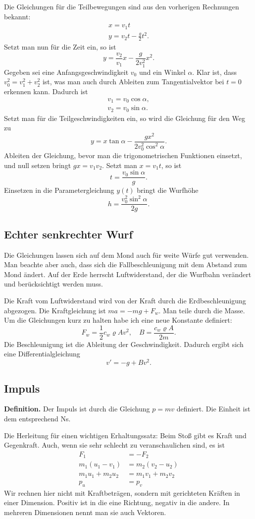 \documentclass[a4paper,10pt,fleqn,twocolumn,twoside]{scrartcl}
\begin{document}
Die Gleichungen für die Teilbewegungen sind aus den vorherigen
Rechnungen bekannt:%
\begin{gather*}
x = v_1t\\
y = v_2t - \frac{g}{2}t^2.
\end{gather*}
Setzt man nun für die Zeit ein, so ist%
\[y = \frac{v_2}{v_1}x - \frac{g}{2v_1^2} x^2.\]
Gegeben sei eine Anfangsgeschwindigkeit $v_0$ und ein
Winkel $\alpha$. Klar ist, dass $v_0^2=v_1^2+v_2^2$ ist,
was man auch durch Ableiten zum Tangentialvektor bei $t=0$
erkennen kann. Dadurch ist%
\begin{gather*}
v_1 = v_0\cos\alpha,\\
v_2 = v_0\sin\alpha.
\end{gather*}
Setzt man für die Teilgeschwindigkeiten ein, so wird die Gleichung
für den Weg zu%
\[y = x\tan\alpha - \frac{gx^2}{2v_0^2\cos^2\alpha}.\]
Ableiten der Gleichung, bevor man die trigonometrischen Funktionen
einsetzt, und null setzen bringt $gx = v_1v_2$.
Setzt man $x=v_1t$, so ist%
\[t = \frac{v_0\sin\alpha}{g}.\]
Einsetzen in die Parametergleichung $y(t)$ bringt die Wurfhöhe%
\[h = \frac{v_0^2\sin^2\alpha}{2g}.\]

\subsection{Echter senkrechter Wurf}

Die Gleichungen lassen sich auf dem Mond auch für weite Würfe gut
verwenden. Man beachte aber auch, dass sich die Fall{}beschleunigung
mit dem Abstand zum Mond ändert. Auf der Erde herrscht Luftwiderstand,
der die Wurfbahn verändert und berücksichtigt werden muss.

Die Kraft vom Luftwiderstand wird von der Kraft durch die
Erdbeschleunigung abgezogen. Die Kraftgleichung ist $ma = -mg + F_w$.
Man teile durch die Masse. Um die Gleichungen kurz zu halten habe
ich eine neue Konstante definiert:%
\[F_w = \frac{1}{2}c_w\varrho Av^2,\quad B = \frac{c_w\varrho A}{2m}.\]
Die Beschleunigung ist die Ableitung der Geschwindigkeit.
Dadurch ergibt sich eine Differentialgleichung%
\[v' = -g + Bv^2.\]

\subsection{Impuls}

\textbf{Definition.} Der Impuls ist durch die Gleichung $p=mv$
definiert. Die Einheit ist dem entsprechend Ns.

Die Herleitung für einen wichtigen Erhaltungssatz: Beim Stoß gibt es
Kraft und Gegenkraft. Auch, wenn sie sehr schlecht zu
veranschaulichen sind, es ist%
\begin{align*}
F_1 &= -F_2\\
m_1(u_1-v_1) &= m_2(v_2-u_2)\\
m_1u_1+m_2u_2 &= m_1v_1+m_2v_2\\
p_u &= p_v
\end{align*}
Wir rechnen hier nicht mit Kraftbeträgen, sondern mit
gerichteten Kräften in einer Dimension. Positiv ist in die
eine Richtung, negativ in die andere. In mehreren Dimensionen nennt
man sie auch Vektoren.
\end{document}
